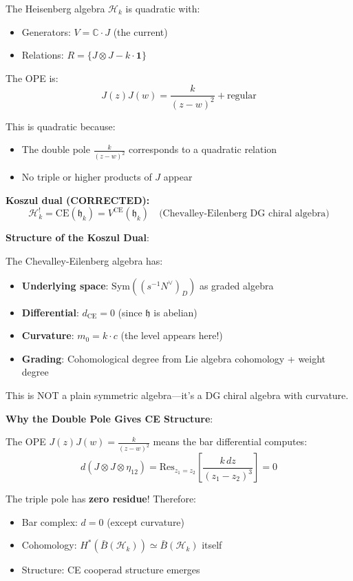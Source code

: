 \begin{example}\label{ex:heisenberg-quadratic}
The Heisenberg algebra $\mathcal{H}_k$ is quadratic with:
\begin{itemize}
\item Generators: $V = \mathbb{C} \cdot J$ (the current)
\item Relations: $R = \{J \otimes J - k \cdot \mathbf{1}\}$
\end{itemize}

The OPE is:
$$J(z)J(w) = \frac{k}{(z-w)^2} + \text{regular}$$

This is quadratic because:
\begin{itemize}
\item The double pole $\frac{k}{(z-w)^2}$ corresponds to a quadratic relation
\item No triple or higher products of $J$ appear
\end{itemize}

\textbf{Koszul dual (CORRECTED):}
$$\mathcal{H}_k^! = \text{CE}(\mathfrak{h}_k) = V^{\text{CE}}(\mathfrak{h}_k) \quad \text{(Chevalley-Eilenberg DG chiral algebra)}$$

\textbf{Structure of the Koszul Dual}:

The Chevalley-Eilenberg algebra has:
\begin{itemize}
\item \textbf{Underlying space}: $\text{Sym}((s^{-1}N^\vee)_D)$ as graded algebra
\item \textbf{Differential}: $d_{\text{CE}} = 0$ (since $\mathfrak{h}$ is abelian)
\item \textbf{Curvature}: $m_0 = k \cdot c$ (the level appears here!)
\item \textbf{Grading}: Cohomological degree from Lie algebra cohomology + weight degree
\end{itemize}

This is NOT a plain symmetric algebra—it's a DG chiral algebra with curvature.

\textbf{Why the Double Pole Gives CE Structure}:

The OPE $J(z)J(w) = \frac{k}{(z-w)^2}$ means the bar differential computes:
$$d(J \otimes J \otimes \eta_{12}) = \text{Res}_{z_1=z_2}\left[\frac{k \, dz}{(z_1-z_2)^3}\right] = 0$$

The triple pole has \textbf{zero residue}! Therefore:
\begin{itemize}
\item Bar complex: $d = 0$ (except curvature)
\item Cohomology: $H^*(\bar{B}(\mathcal{H}_k)) \simeq \bar{B}(\mathcal{H}_k)$ itself
\item Structure: CE cooperad structure emerges
\end{itemize}


\end{example}
